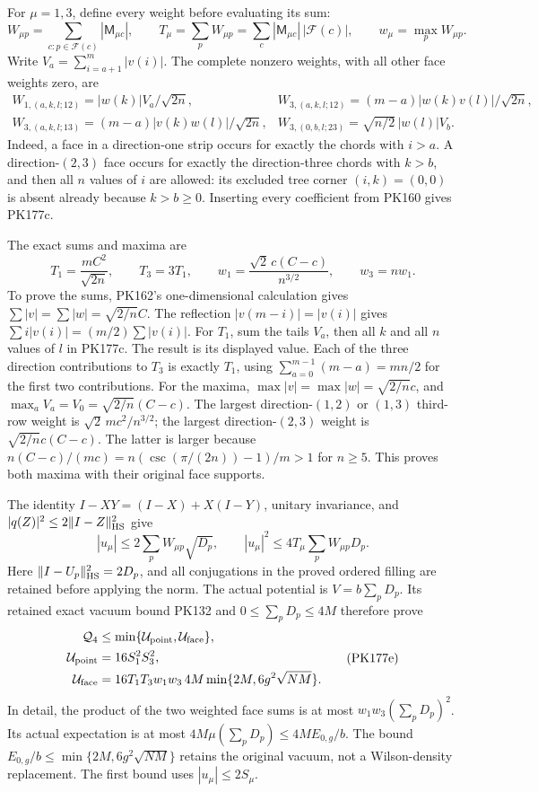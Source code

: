 \documentclass[11pt]{article}
\begin{document}
For \(\mu=1,3\), define every weight before evaluating its sum:
\[
 W_{\mu p}=\sum_{c:p\in\mathcal F(c)}|\mathsf M_{\mu c}|,\qquad
 T_\mu=\sum_pW_{\mu p}
      =\sum_c|\mathsf M_{\mu c}|\,|\mathcal F(c)|,\qquad
 w_\mu=\max_p W_{\mu p}.
 \tag{PK177b}
\]
Write \(V_a=\sum_{i=a+1}^{m}|v(i)|\).
The complete nonzero weights, with all other face weights zero, are
\[
 \begin{array}{ll}
 W_{1,(a,k,l;12)}=|w(k)|V_a/\sqrt{2n},&
 W_{3,(a,k,l;12)}=(m-a)|w(k)v(l)|/\sqrt{2n},\\
 W_{3,(a,k,l;13)}=(m-a)|v(k)w(l)|/\sqrt{2n},&
 W_{3,(0,b,l;23)}=\sqrt{n/2}\,|w(l)|V_b .
 \end{array}\tag{PK177c}
\]
Indeed, a face in a direction-one strip occurs for exactly the
chords with \(i>a\). A direction-\((2,3)\) face occurs for
exactly the direction-three chords with \(k>b\), and then all
\(n\) values of \(i\) are allowed: its excluded tree corner
\((i,k)=(0,0)\) is absent already because \(k>b\ge0\).
Inserting every coefficient from PK160 gives PK177c.

The exact sums and maxima are
\[
 T_1=\frac{mC^2}{\sqrt{2n}},\qquad T_3=3T_1,\qquad
 w_1=\frac{\sqrt2\,c(C-c)}{n^{3/2}},\qquad w_3=nw_1 .
 \tag{PK177d}
\]
To prove the sums, PK162's one-dimensional calculation gives
\(\sum|v|=\sum|w|=\sqrt{2/n}C\).
The reflection \(|v(m-i)|=|v(i)|\) gives
\(\sum i|v(i)|=(m/2)\sum|v(i)|\).
For \(T_1\), sum the tails \(V_a\), then all \(k\) and all
\(n\) values of \(l\) in PK177c. The result is its displayed
value. Each of the three direction contributions to \(T_3\)
is exactly \(T_1\), using
\(\sum_{a=0}^{m-1}(m-a)=mn/2\) for the first two contributions.
For the maxima, \(\max|v|=\max|w|=\sqrt{2/n}c\), and
\(\max_aV_a=V_0=\sqrt{2/n}(C-c)\).
The largest direction-\((1,2)\) or \((1,3)\) third-row weight is
\(\sqrt2\,mc^2/n^{3/2}\); the largest direction-\((2,3)\) weight
is \(\sqrt{2/n}c(C-c)\).
The latter is larger because
\(n(C-c)/(mc)=n(\csc(\pi/(2n))-1)/m>1\) for \(n\ge5\).
This proves both maxima with their original face supports.

The identity \(I-XY=(I-X)+X(I-Y)\), unitary invariance, and
\(|q(Z)|^2\le2\|I-Z\|_{\rm HS}^2\) give
\[
 |u_\mu|\le2\sum_pW_{\mu p}\sqrt{D_p},\qquad
 |u_\mu|^2\le4T_\mu\sum_pW_{\mu p}D_p .
\]
Here \(\|I-U_p\|_{\rm HS}^2=2D_p\), and all conjugations in
the proved ordered filling are retained before applying the norm.
The actual potential is \(V=b\sum_pD_p\). Its retained exact
vacuum bound PK132 and \(0\le\sum_pD_p\le4M\) therefore prove
\[
 \begin{split}
 \mathcal Q_4&\le\min\{\mathcal U_{\rm point},
                                      \mathcal U_{\rm face}\},\\
 \mathcal U_{\rm point}&=16S_1^2S_3^2,\\
 \mathcal U_{\rm face}
 &=16T_1T_3w_1w_3\,4M
                      \min\{2M,6g^2\sqrt{NM}\}.
 \end{split}\tag{PK177e}
\]
In detail, the product of the two weighted face sums is at most
\(w_1w_3(\sum_pD_p)^2\).
Its actual expectation is at most
\(4M\mu(\sum_pD_p)\le4M E_{0,g}/b\).
The bound \(E_{0,g}/b\le\min\{2M,6g^2\sqrt{NM}\}\)
retains the original vacuum, not a Wilson-density replacement.
The first bound uses \(|u_\mu|\le2S_\mu\).
\end{document}
